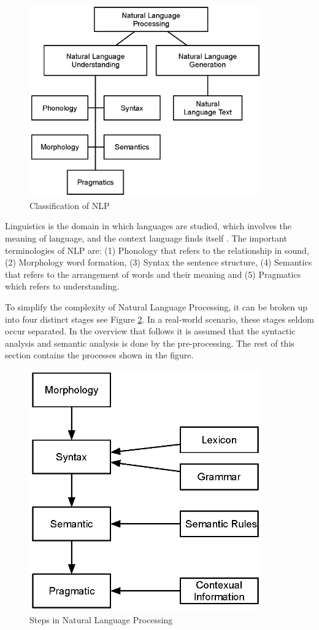 \begin{figure}[htbp]
\centering
\includegraphics[width=10cm]{./figures/NLP3.eps}
\caption{Classification of NLP}
\label{fig:CNLP}
\end{figure}
Linguistics is the domain in which languages are studied, which involves the meaning of language, and the context language finds itself \cite{Bates9977}. The important terminologies of NLP are: (1) Phonology that refers to the relationship in sound, (2) Morphology word formation, (3) Syntax the sentence structure, (4) Semantics that refers to the arrangement of words and their meaning \cite{hassan2021natural} and (5) Pragmatics which refers to understanding.

To simplify the complexity of Natural Language Processing, it can be broken up into four distinct stages see Figure \ref{fig:stepsnlp}. In a real-world scenario, these stages seldom occur separated. In the overview that follows it is assumed that the syntactic analysis and semantic analysis is done by the pre-processing. The rest of this section contains the processes shown in the figure.
\begin{figure}[htbp]
\centering
\includegraphics[width=10cm]{./figures/NLPstep.eps}
\caption{Steps in Natural Language Processing}
\label{fig:stepsnlp}
\end{figure}
